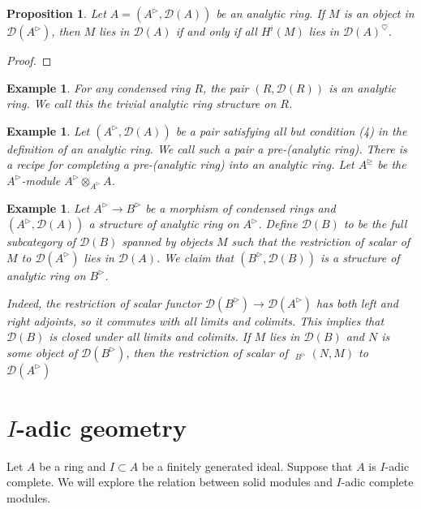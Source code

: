 \documentclass{article}
\theoremstyle{plain}
\newtheorem{prop}[thm]{Proposition}
\newtheorem{exmp}[thm]{Example}
\theoremstyle{definition}
\theoremstyle{remark}
\DeclareMathOperator{\rhoms}{\underline{RHom}}
\newcommand{\huflag}{\triangleright}
\newcommand{\D}{\mathcal{D}}
\newcommand{\heart}{\heartsuit}
\begin{document}
\begin{prop}
Let $ A = (A ^{\huflag}, \D (A)) $ be an analytic ring.
If $ M $ is an object in $ \D (A ^{\huflag}) $, then $ M $ lies in $ \D (A) $ if and only if all $ H ^{i}(M) $ lies in $ \D (A)^{\heart} $.
\end{prop}

\begin{proof}

\end{proof}

\begin{exmp}
For any condensed ring $ R $, the pair $ (R, \D (R)) $ is an analytic ring. We call this the trivial analytic ring structure on $ R $.
\end{exmp}

\begin{exmp}
Let $ (A ^{\huflag}, \D (A)) $ be a pair satisfying all but condition (4) in the definition of an analytic ring.
We call such a pair a \emph{pre-(analytic ring)}.
There is a recipe for completing a pre-(analytic ring) into an analytic ring.
Let $ A ^{\trianglerighteq} $ be the $ A ^{\huflag} $-module $ A ^{\huflag} \otimes _{A ^{\huflag}} A $.
\end{exmp}

\begin{exmp}
Let $ A ^{\huflag}\to B ^{\huflag} $ be a morphism of condensed rings and $ (A ^{\huflag}, \D (A)) $ a structure of analytic ring on $ A ^{\huflag} $.
Define $ \D (B) $ to be the full subcategory of $ \D (B) $ spanned by objects $ M $ such that the restriction of scalar of $ M $ to $ \D (A ^{\huflag}) $
lies in $ \D (A) $. We claim that $ (B ^{\huflag}, \D(B)) $ is a structure of analytic ring on $ B ^{\huflag} $.

Indeed, the restriction of scalar functor $ \D (B ^{\huflag})\to \D (A ^{\huflag}) $ has both left and right adjoints, so it commutes with all limits and colimits.
This implies that $ \D (B) $ is closed under all limits and colimits.
If $ M $ lies in $ \D (B) $ and $ N $ is some object of $ \D (B ^{\huflag}) $,
then the restriction of scalar of $ \rhoms _{B ^{\huflag}}(N, M) $ to $ \D (A ^{\huflag}) $
\end{exmp}

\section{\texorpdfstring{$ I $}{I}-adic geometry}

Let $ A $ be a ring and $ I\subset A $ be a finitely generated ideal. Suppose that $ A $ is $ I $-adic complete.
We will explore the relation between solid modules and $ I $-adic complete modules.
\end{document}
